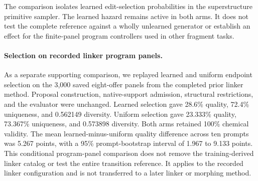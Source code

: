 The comparison isolates learned edit-selection probabilities in the
superstructure primitive sampler. The learned hazard remains active in both
arms. It does not test the complete reference against a wholly unlearned
generator or establish an effect for the finite-panel program controllers
used in other fragment tasks.

\paragraph{Selection on recorded linker program panels.}
As a separate supporting comparison, we replayed learned and uniform endpoint
selection on the 3,000 saved eight-offer panels from the completed prior
linker method. Proposal construction, native-support admission, structural
restrictions, and the evaluator were unchanged. Learned selection gave
28.6\% quality, 72.4\% uniqueness, and 0.562149 diversity. Uniform selection
gave 23.333\% quality, 73.367\% uniqueness, and 0.573898 diversity. Both
arms retained 100\% chemical validity. The mean learned-minus-uniform
quality difference across ten prompts was 5.267 points, with a 95\%
prompt-bootstrap interval of 1.967 to 9.133 points. This conditional
program-panel comparison does not remove the training-derived linker catalog
or test the entire transition reference. It applies to the recorded linker
configuration and is not transferred to a later linker or morphing method.
